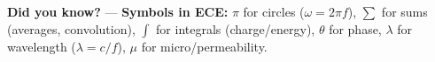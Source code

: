 \begin{tcolorbox}[
  colback=SoftYellow,
  colframe=IEEEblue!70!black,
  boxrule=0.5pt,
  arc=0mm,
  left=3mm, right=3mm, top=2mm, bottom=2mm
]
\small\RaggedRight \textbf{\color{IEEEblue!75!black}Did you know?} — \textbf{Symbols in ECE:} $\pi$ for circles ($\omega=2\pi f$), $\sum$ for sums (averages, convolution), $\int$ for integrals (charge/energy), $\theta$ for phase, $\lambda$ for wavelength ($\lambda=c/f$), $\mu$ for micro/permeability.
\end{tcolorbox}
